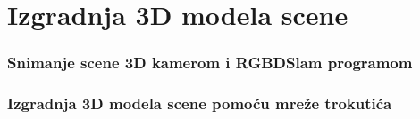 \newpage

\section{Izgradnja 3D modela scene} %
\label{sec:Izgradnja 3D modela scene}

\subsubsection{Snimanje scene 3D kamerom i RGBDSlam programom} %
\label{ssub:Snimanje scene 3D kamerom i RGBDSlam programom}

\subsubsection{Izgradnja 3D modela scene pomoću mreže trokutića} %
\label{ssub:Izgradnja 3D modela scene pomoću mreže trokutića}


